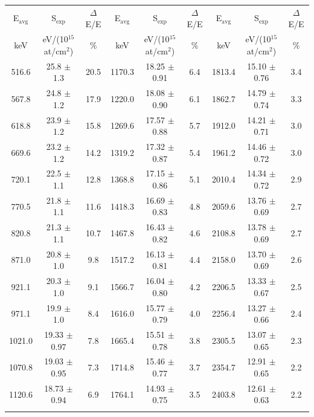 \documentclass[aps,pra,reprint,superscriptaddress]{revtex4-1}
\begin{document}
\begin{table}[!t]
\begin{ruledtabular}
\begin{tabular}{ccc|ccc|ccc} %
E$_{\mathrm{avg}}$ & S$_{\mathrm{exp}}$       & $\Delta$E/E & E$_{\mathrm{avg}}$ & S$_{\mathrm{exp}}$       & $\Delta$E/E & E$_{\mathrm{avg}}$ & S$_{\mathrm{exp}}$       & $\Delta$E/E \\
keV                & eV/(10$^{15}$ at/cm$^2$) & \%          & keV                & eV/(10$^{15}$ at/cm$^2$)	& \%          & keV                & eV/(10$^{15}$ at/cm$^2$) & \% \\ \hline
516.6	 & 25.8	$\pm$	1.3	&	20.5	&	1170.3	&	18.25	$\pm$	0.91	&	6.4	&	1813.4	&	15.10	$\pm$	0.76	&	3.4	\\
567.8	 & 24.8	$\pm$	1.2	&	17.9	&	1220.0	&	18.08	$\pm$	0.90	&	6.1	&	1862.7	&	14.79	$\pm$	0.74	&	3.3	\\
618.8	 & 23.9	$\pm$	1.2	&	15.8	&	1269.6	&	17.57	$\pm$	0.88	&	5.7	&	1912.0	&	14.21	$\pm$	0.71	&	3.0	\\
669.6	 & 23.2	$\pm$	1.2	&	14.2	&	1319.2	&	17.32	$\pm$	0.87	&	5.4	&	1961.2	&	14.46	$\pm$	0.72	&	3.0	\\
720.1	 & 22.5	$\pm$	1.1	&	12.8	&	1368.8	&	17.15	$\pm$	0.86	&	5.1	&	2010.4	&	14.34	$\pm$	0.72	&	2.9	\\
770.5	 & 21.8	$\pm$	1.1	&	11.6	&	1418.3	&	16.69	$\pm$	0.83	&	4.8	&	2059.6	&	13.76	$\pm$	0.69	&	2.7	\\
820.8	 & 21.3	$\pm$	1.1	&	10.7	&	1467.8	&	16.43	$\pm$	0.82	&	4.6	&	2108.8	&	13.78	$\pm$	0.69	&	2.7	\\
871.0	 & 20.8	$\pm$	1.0	&	9.8	&	1517.2	&	16.13	$\pm$	0.81	&	4.4	&	2158.0	&	13.70	$\pm$	0.69	&	2.6	\\
921.1	 & 20.3	$\pm$	1.0	&	9.1	&	1566.7	&	16.04	$\pm$	0.80	&	4.2	&	2206.5	&	13.33	$\pm$	0.67	&	2.5	\\
971.1	 & 19.9	$\pm$	1.0	&	8.4	&	1616.0	&	15.77	$\pm$	0.79	&	4.0	&	2256.4	&	13.27	$\pm$	0.66	&	2.4	\\
1021.0 & 19.33	$\pm$	0.97	&	7.8	&	1665.4	&	15.51	$\pm$	0.78	&	3.8	&	2305.5	&	13.07	$\pm$	0.65	&	2.3	\\
1070.8 & 19.03	$\pm$	0.95	&	7.3	&	1714.8	&	15.46	$\pm$	0.77	&	3.7	&	2354.7	&	12.91	$\pm$	0.65	&	2.2	\\
1120.6 & 18.73	$\pm$	0.94	&	6.9	&	1764.1	&	14.93	$\pm$	0.75	&	3.5	&	2403.8	&	12.61	$\pm$	0.63	&	2.2	\\ \\ 
\end{tabular}
\end{ruledtabular}
\end{table}
\end{document}
